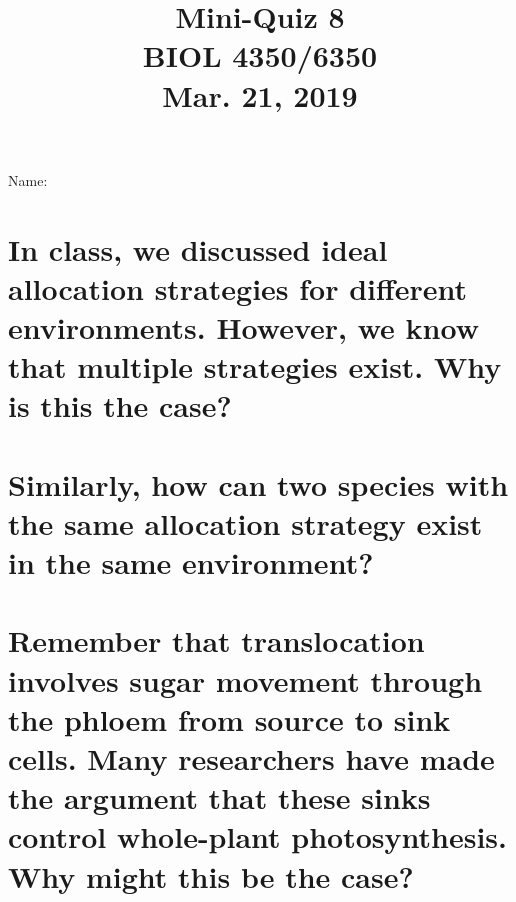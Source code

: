 \documentclass[12pt, notitlepage]{article}   	%
\title{
	\textbf{
		Mini-Quiz 8
	} \\
	\large BIOL 4350/6350 \\
	\large Mar. 21, 2019 \\
}
\date{\vspace{-5ex}}
\def\wl{\par \vspace{\baselineskip}}
\begin{document}
{\selectfont %

\large{Name:}

{\let\newpage\relax\maketitle}

\section{\small{In class, we discussed ideal allocation strategies for different 
environments. However, we know that multiple strategies exist. Why is this the case?}}
\wl
\wl
\wl
\wl
\wl
\wl
\wl
\wl
\wl
\wl

\section{\small{Similarly, how can two species with the same allocation strategy exist 
in the same environment?}}

\newpage

\section{\small{Remember that translocation involves sugar movement through the 
phloem from source to sink cells. Many researchers have made the argument that these sinks
control whole-plant photosynthesis. Why might this be the case?}}

} %
\end{document}
